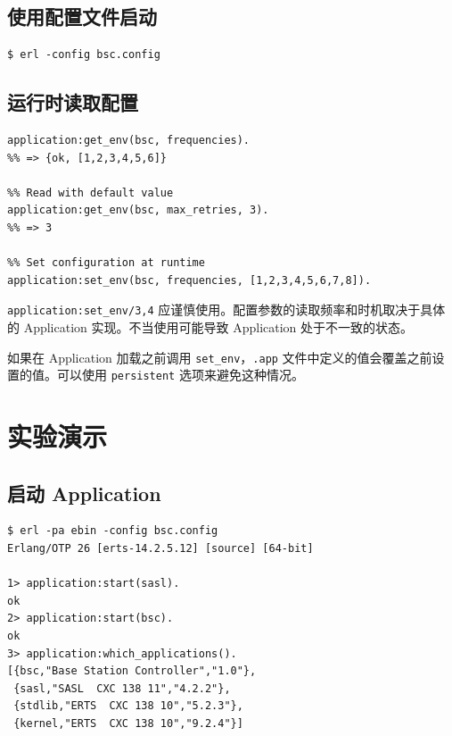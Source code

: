\documentclass[a4paper,11pt]{article}
\begin{document}
\subsection{使用配置文件启动}

\begin{lstlisting}[style=shellstyle, caption={使用配置文件启动 Erlang 节点}]
$ erl -config bsc.config
\end{lstlisting}

\subsection{运行时读取配置}

\begin{lstlisting}[style=erlangstyle, caption={运行时读取和设置环境变量}]
%% Read configuration
application:get_env(bsc, frequencies).
%% => {ok, [1,2,3,4,5,6]}

%% Read with default value
application:get_env(bsc, max_retries, 3).
%% => 3

%% Set configuration at runtime
application:set_env(bsc, frequencies, [1,2,3,4,5,6,7,8]).
\end{lstlisting}

\begin{warnbox}[运行时修改配置的注意事项]
\texttt{application:set\_env/3,4} 应谨慎使用。配置参数的读取频率和时机取决于具体的 Application 实现。不当使用可能导致 Application 处于不一致的状态。

如果在 Application 加载之前调用 \texttt{set\_env}，\texttt{.app} 文件中定义的值会覆盖之前设置的值。可以使用 \texttt{persistent} 选项来避免这种情况。
\end{warnbox}


\section{实验演示}

\subsection{启动 Application}

\begin{lstlisting}[style=shellstyle, caption={启动 BSC Application}]
$ erl -pa ebin -config bsc.config
Erlang/OTP 26 [erts-14.2.5.12] [source] [64-bit]

1> application:start(sasl).
ok
2> application:start(bsc).
ok
3> application:which_applications().
[{bsc,"Base Station Controller","1.0"},
 {sasl,"SASL  CXC 138 11","4.2.2"},
 {stdlib,"ERTS  CXC 138 10","5.2.3"},
 {kernel,"ERTS  CXC 138 10","9.2.4"}]
\end{lstlisting}
\end{document}

